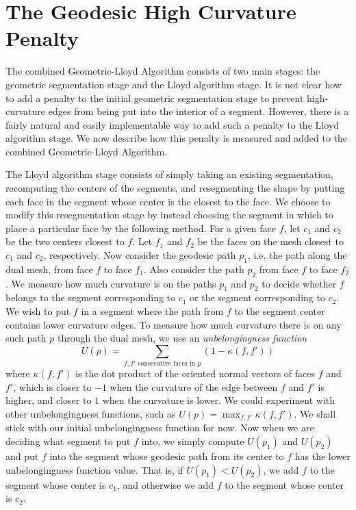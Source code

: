 \documentclass{article}
\begin{document}

\section{The Geodesic High Curvature Penalty}
The combined Geometric-Lloyd Algorithm consists of two main stages: the
geometric segmentation stage and the Lloyd algorithm stage.  It is not clear
how to add a penalty to the initial geometric segmentation stage to prevent
high-curvature edges from being put into the interior of a segment.  However,
there is a fairly natural and easily implementable way to add such a penalty
to the Lloyd algorithm stage.  We now describe how this penalty is measured
and added to the combined Geometric-Lloyd Algorithm.

The Lloyd algorithm stage consists of simply taking an existing segmentation,
recomputing the centers of the segments, and resegmenting the shape by putting
each face in the segment whose center is the closest to the face.  We choose
to modify this resegmentation stage by instead choosing the segment in which
to place a particular face by the following method.  For a given face $f$,
let $c_1$ and $c_2$ be the two centers closest to $f$.  Let $f_1$ and $f_2$ be
the faces on the mesh closest to $c_1$ and $c_2$, respectively.  Now consider
the geodesic path $p_1$, i.e. the path along the dual mesh, from face $f$ to
face $f_1$.  Also consider the path $p_2$ from face $f$ to face $f_2$.  We
measure how much curvature is on the paths $p_1$ and $p_2$ to decide whether
$f$ belongs to the segment corresponding to $c_1$ or the segment corresponding
to $c_2$.  We wish to put $f$ in a segment where the path from $f$ to the
segment center contains lower curvature edges.  To measure how much curvature
there is on any such path $p$ through the dual mesh, we use an
{\em unbelongingness function}
\[ U(p) = \sum_{\mbox{$f,f'$ consecutive faces in $p$}} (1-\kappa(f,f')) \]
where $\kappa(f,f')$ is the dot product of the oriented normal vectors of
faces $f$ and $f'$, which is closer to $-1$ when the curvature of the edge
between $f$ and $f'$ is higher, and closer to $1$ when the curvature is lower.
We could experiment with other unbelongingness functions, such as $U(p)=
\max_{f,f'} \kappa(f,f')$.  We shall stick with our initial unbelongingness
function for now.  Now when we are deciding what segment to put $f$ into, we
simply compute $U(p_1)$ and $U(p_2)$ and put $f$ into the segment whose
geodesic path from its center to $f$ has the lower unbelongingness function
value.  That is, if $U(p_1) < U(p_2)$, we add $f$ to the segment whose center
is $c_1$, and otherwise we add $f$ to the segment whose center is $c_2$.
\end{document}
